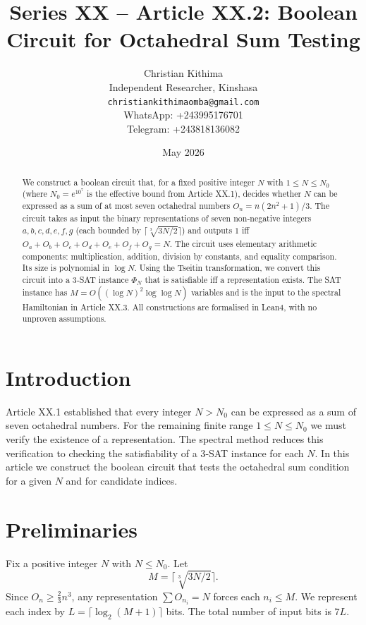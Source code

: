 \documentclass[11pt,a4paper]{article}
\title{Series XX – Article XX.2: Boolean Circuit for Octahedral Sum Testing}
\author{Christian Kithima \\
Independent Researcher, Kinshasa \\
\texttt{christiankithimaomba@gmail.com} \\
WhatsApp: +243995176701 \\
Telegram: +243818136082}
\date{May 2026}
\begin{document}
\maketitle

\begin{abstract}
We construct a boolean circuit that, for a fixed positive integer \(N\) with \(1\le N\le N_0\) (where \(N_0 = e^{10^7}\) is the effective bound from Article XX.1), decides whether \(N\) can be expressed as a sum of at most seven octahedral numbers \(O_n = n(2n^2+1)/3\). The circuit takes as input the binary representations of seven non‑negative integers \(a,b,c,d,e,f,g\) (each bounded by \(\lceil \sqrt[3]{3N/2}\rceil\)) and outputs \(1\) iff \(O_a+O_b+O_c+O_d+O_e+O_f+O_g = N\). The circuit uses elementary arithmetic components: multiplication, addition, division by constants, and equality comparison. Its size is polynomial in \(\log N\). Using the Tseitin transformation, we convert this circuit into a 3‑SAT instance \(\Phi_N\) that is satisfiable iff a representation exists. The SAT instance has \(M = O((\log N)^2 \log \log N)\) variables and is the input to the spectral Hamiltonian in Article XX.3. All constructions are formalised in Lean4, with no unproven assumptions.
\end{abstract}

\tableofcontents

\section{Introduction}

Article XX.1 established that every integer \(N > N_0\) can be expressed as a sum of seven octahedral numbers. For the remaining finite range \(1 \le N \le N_0\) we must verify the existence of a representation. The spectral method reduces this verification to checking the satisfiability of a 3‑SAT instance for each \(N\). In this article we construct the boolean circuit that tests the octahedral sum condition for a given \(N\) and for candidate indices.

\section{Preliminaries}

Fix a positive integer \(N\) with \(N \le N_0\). Let
\[
M = \lceil \sqrt[3]{3N/2} \rceil.
\]
Since \(O_n \ge \frac{2}{3}n^3\), any representation \(\sum O_{n_i}=N\) forces each \(n_i \le M\). We represent each index by \(L = \lceil \log_2(M+1)\rceil\) bits. The total number of input bits is \(7L\).
\end{document}
